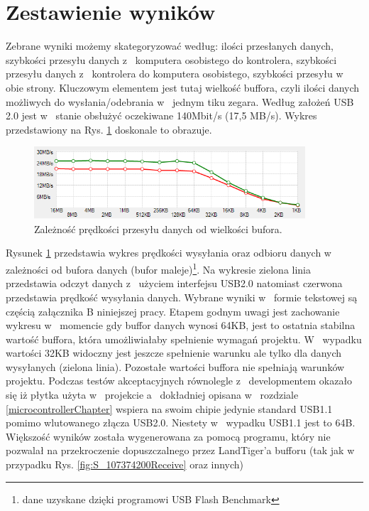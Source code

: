 \documentclass{BscUS}
\begin{document}
\section{Zestawienie wyników}
\indent Zebrane wyniki możemy skategoryzować według: ilości przesłanych danych, szybkości przesyłu danych z~ komputera osobistego do kontrolera, szybkości przesyłu danych z~ kontrolera do komputera osobistego, szybkości przesyłu w~ obie strony. Kluczowym elementem jest tutaj wielkość buffora, czyli ilości danych możliwych do wysłania/odebrania w~ jednym tiku zegara.
\newline
\indent Według założeń USB 2.0 jest w~ stanie obsłużyć oczekiwane 140Mbit/s (17,5 MB/s). Wykres przedstawiony na Rys. \ref{fig:speedTest} doskonale to obrazuje.
\begin{figure}[H]
\centering
\captionsetup{justification=centering}
\includegraphics[width=0.9\textwidth]{./img/speedTest}
\caption{Zależność prędkości przesyłu danych od wielkości bufora.}
\label{fig:speedTest}
\end{figure}
Rysunek \ref{fig:speedTest} przedstawia wykres prędkości wysyłania oraz odbioru danych w~ zależności od bufora danych (bufor maleje)\footnote{dane uzyskane dzięki programowi USB Flash Benchmark\cite{USBFlashBenchmark}}. Na wykresie zielona linia przedstawia odczyt danych z~ użyciem interfejsu USB2.0 natomiast czerwona przedstawia prędkość wysyłania danych. Wybrane wyniki w~ formie tekstowej są częścią załącznika B niniejszej pracy. Etapem godnym uwagi jest zachowanie wykresu w~ momencie gdy buffor danych wynosi 64KB, jest to ostatnia stabilna wartość buffora, która umożliwiałaby spełnienie wymagań projektu. W~ wypadku wartości 32KB widoczny jest jeszcze spełnienie warunku ale tylko dla danych wysyłanych (zielona linia). Pozostałe wartości buffora nie spełniają warunków projektu.
\newline
\indent Podczas testów akceptacyjnych równolegle z~ developmentem okazało się iż płytka użyta w~ projekcie a~ dokładniej opisana w~ rozdziale \ref{microcontrollerChapter} wspiera na swoim chipie jedynie standard USB1.1 pomimo wlutowanego złącza USB2.0. Niestety w~ wypadku USB1.1 jest to 64B. Większość wyników została wygenerowana za pomocą programu, który nie pozwalał na przekroczenie dopuszczalnego przez LandTiger'a bufforu (tak jak w~ przypadku Rys. \ref{fig:S_107374200Receive} oraz innych)
\end{document}
